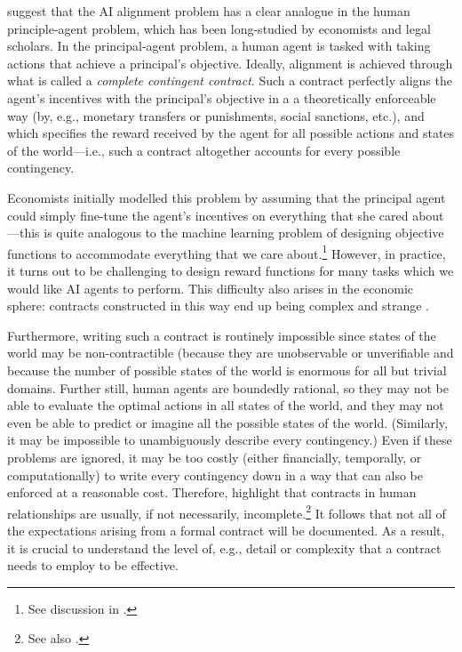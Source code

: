 \documentclass{amsart}
\theoremstyle{indented}
\theoremstyle{indentedProp}
\theoremstyle{indented}
\theoremstyle{indented}
\theoremstyle{indented}
\theoremstyle{indented}
\theoremstyle{indented}
\begin{document}
\citet{Hadfield-Menell-Hadfield-2019} suggest that the AI alignment problem has a clear analogue in the human principle-agent problem, which has been long-studied by economists and legal scholars. In the principal-agent problem, a human agent is tasked with taking actions that achieve a principal's objective. Ideally, alignment is achieved through what is called a {\it complete contingent contract}. Such a contract perfectly aligns the agent's incentives with the principal's objective in a a theoretically enforceable way (by, e.g., monetary transfers or punishments, social sanctions, etc.), and which specifies the reward received by the agent for all possible actions and states of the world---i.e., such a contract altogether accounts for every possible contingency.

Economists initially modelled this problem by assuming that the principal agent could simply fine-tune the agent's incentives on everything that she cared about---this is quite analogous to the machine learning problem of designing objective functions to accommodate everything that we care about.\footnote{See discussion in \citet{Russell-2019}.} However, in practice, it turns out to be challenging to design reward functions for many tasks which we would like AI agents to perform. This difficulty also arises in the economic sphere: contracts constructed in this way end up being complex and strange \citep[p. 4]{Hadfield-2019}. 

Furthermore, writing such a contract is routinely impossible since states of the world may be non-contractible (because they are unobservable or unverifiable and because the number of possible states of the world is enormous for all but trivial domains. Further still, human agents are boundedly rational, so they may not be able to evaluate the optimal actions in all states of the world, and they may not even be able to predict or imagine all the possible states of the world. (Similarly, it may be impossible to unambiguously describe every contingency.) Even if these problems are ignored, it may be too costly (either financially, temporally, or computationally) to write every contingency down in a way that can also be enforced at a reasonable cost. Therefore, \citet{Hadfield-Menell-Hadfield-2019} highlight that contracts in human relationships are usually, if not necessarily, incomplete.\footnote{See also \citet{Simon-1982, Grossman-Hart-1986, Williamson-1996, Bernheim-Whinston-1998, Graebner-2009}.} It follows that not all of the expectations arising from a formal contract will be documented. As a result, it is crucial to understand the level of, e.g., detail \citep{Mayer-Argyres-2004} or complexity \citep{Reuer-Arino-2007} that a contract needs to employ to be effective. 
\end{document}
